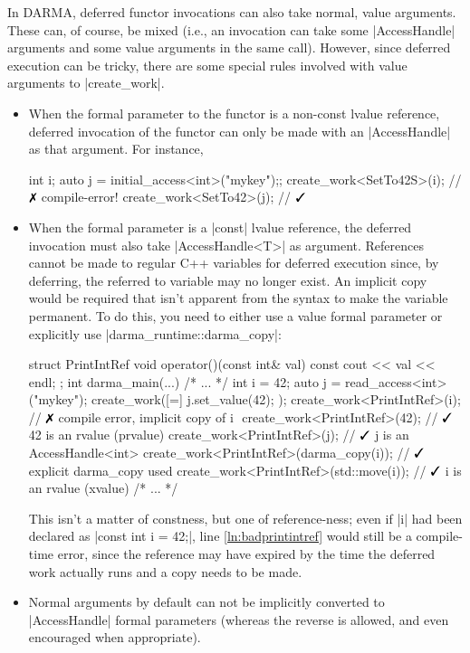 In DARMA, deferred functor invocations can also take normal, value arguments. 
These can, of course, be mixed (i.e., an invocation can take some
|AccessHandle| arguments and some value arguments in the same call).  However,
since deferred execution can be tricky, there are some special rules involved with value arguments to |create_work|.
\begin{itemize}
  \item When the formal parameter to the functor is a non-const lvalue
  reference, deferred invocation of the functor can only be made
  with an |AccessHandle| as that argument.  For instance,
\begin{CppCodeNumb}
int i;
auto j = initial_access<int>("mykey");;
create_work<SetTo42S>(i); // $\no$ compile-error!
create_work<SetTo42>(j); // $\yes$
\end{CppCodeNumb}
  \item When the formal parameter is a |const| lvalue reference, the deferred
  invocation must also take |AccessHandle<T>| as argument.  
  References cannot be made to regular C++ variables for deferred execution since, by deferring,
  the referred to variable may no longer exist.
  An implicit copy would be required that isn't apparent from the syntax to make the variable permanent.  
  To do this, you need to either use a value formal parameter or explicitly use
  |darma_runtime::darma_copy|:
\begin{CppCodeNumb}
struct PrintIntRef {
  void operator()(const int& val) const { cout << val << endl; }
};
int darma_main(...) {
  /* ... */
  int i = 42;
  auto j = read_access<int>("mykey");
  create_work([=]{ j.set_value(42); });
  create_work<PrintIntRef>(i); // $\no$ compile error, implicit copy of i $\label{ln:badprintintref}$
  create_work<PrintIntRef>(42); // $\yes$ 42 is an rvalue (prvalue)
  create_work<PrintIntRef>(j); // $\yes$ j is an AccessHandle<int>
  create_work<PrintIntRef>(darma_copy(i)); // $\yes$ explicit darma_copy used
  create_work<PrintIntRef>(std::move(i)); // $\yes$ i is an rvalue (xvalue)
  /* ... */
}
\end{CppCodeNumb}
  This isn't a matter of constness, but one of reference-ness; even if |i| had
  been declared as |const int i = 42;|, line \ref{ln:badprintintref} would still
  be a compile-time error, since the reference may have expired by the time the
  deferred work actually runs and a copy needs to be made.
\item Normal arguments by default can not be implicitly converted to |AccessHandle| formal
  parameters (whereas the reverse is allowed, and even encouraged when appropriate).
\end{itemize}


